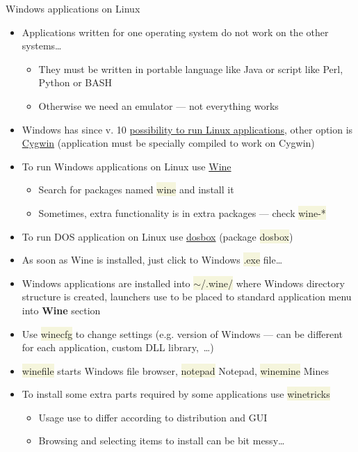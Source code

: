 \documentclass[compress, xelatex, 11pt, xcolor=svgnames, aspectratio=169, url={hyphens, lowtilde}]{beamer}
\renewcommand{\texttt}[1]{\colorbox{Beige}{{\ttfamily #1}}}
\begin{document}
\begin{frame}[allowframebreaks]{Windows applications on Linux}
	\begin{itemize}
		\item Applications written for one operating system do not work on the other systems\ldots
		\begin{itemize}
			\item They must be written in portable language like Java or script like Perl, Python or BASH
			\item Otherwise we need an emulator --- not everything works
		\end{itemize}
		\item Windows has since v. 10 \href{https://learn.microsoft.com/windows/wsl/install}{possibility to run Linux applications}, other option is \href{https://www.cygwin.com/}{Cygwin} (application must be specially compiled to work on Cygwin)
		\item To run Windows applications on Linux use \href{https://www.winehq.org/}{Wine}
		\begin{itemize}
			\item Search for packages named \texttt{wine} and install it
			\item Sometimes, extra functionality is in extra packages --- check \texttt{wine-*}
		\end{itemize}
		\item To run DOS application on Linux use \href{https://www.dosbox.com/}{dosbox} (package \texttt{dosbox})
		\item As soon as Wine is installed, just click to Windows \texttt{*.exe} file\ldots
		\item Windows applications are installed into \texttt{$\sim$/.wine/} where Windows directory structure is created, launchers use to be placed to standard application menu into \textbf{Wine} section
		\item Use \texttt{winecfg} to change settings (e.g. version of Windows --- can be different for each application, custom DLL library,~\ldots)
		\item \texttt{winefile} starts Windows file browser, \texttt{notepad} Notepad, \texttt{winemine} Mines
		\item To install some extra parts required by some applications use \texttt{winetricks}
		\begin{itemize}
			\item Usage use to differ according to distribution and GUI
			\item Browsing and selecting items to install can be bit messy\ldots

\end{itemize}
\end{itemize}
\end{frame}
\end{document}
